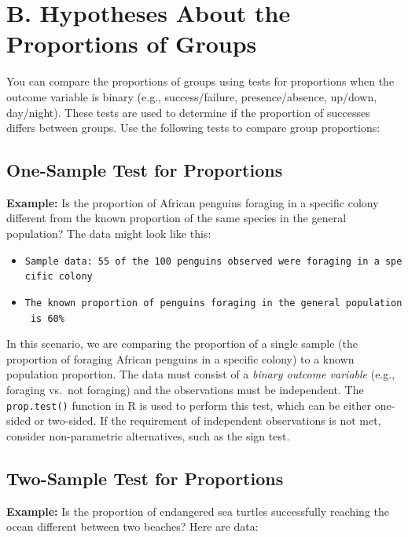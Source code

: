 \documentclass[
  letterpaper,
]{book}
\providecommand{\tightlist}{%
  \setlength{\itemsep}{0pt}\setlength{\parskip}{0pt}}\usepackage{longtable,booktabs,array}
\begin{document}
\section{B. Hypotheses About the Proportions of
Groups}\label{b.-hypotheses-about-the-proportions-of-groups}

You can compare the proportions of groups using tests for proportions
when the outcome variable is binary (e.g., success/failure,
presence/absence, up/down, day/night). These tests are used to determine
if the proportion of successes differs between groups. Use the following
tests to compare group proportions:

\subsection{One-Sample Test for
Proportions}\label{one-sample-test-for-proportions}

\textbf{Example:} Is the proportion of African penguins foraging in a
specific colony different from the known proportion of the same species
in the general population? The data might look like this:

\begin{itemize}
\tightlist
\item
  \texttt{Sample\ data:\ 55\ of\ the\ 100\ penguins\ observed\ were\ foraging\ in\ a\ specific\ colony}
\item
  \texttt{The\ known\ proportion\ of\ penguins\ foraging\ in\ the\ general\ population\ is\ 60\%}
\end{itemize}

In this scenario, we are comparing the proportion of a single sample
(the proportion of foraging African penguins in a specific colony) to a
known population proportion. The data must consist of a \emph{binary
outcome variable} (e.g., foraging vs.~not foraging) and the observations
must be independent. The \texttt{prop.test()} function in R is used to
perform this test, which can be either one-sided or two-sided. If the
requirement of independent observations is not met, consider
non-parametric alternatives, such as the sign test.

\subsection{Two-Sample Test for
Proportions}\label{two-sample-test-for-proportions}

\textbf{Example:} Is the proportion of endangered sea turtles
successfully reaching the ocean different between two beaches? Here are
data:
\end{document}
